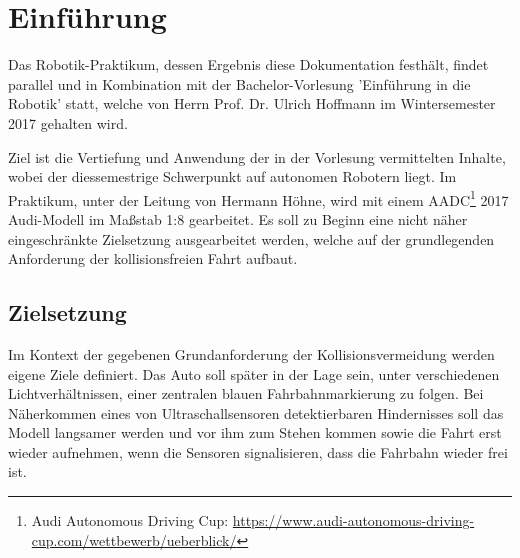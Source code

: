 \documentclass[12pt, a4paper]{scrartcl}
\begin{document}
\section{Einführung}

Das Robotik-Praktikum, dessen Ergebnis diese Dokumentation festhält, findet parallel und in Kombination mit der Bachelor-Vorlesung 'Einführung in die Robotik' statt, welche von Herrn Prof. Dr. Ulrich Hoffmann im Wintersemester 2017 gehalten wird.

Ziel ist die Vertiefung und Anwendung der in der Vorlesung vermittelten Inhalte, wobei der diessemestrige Schwerpunkt  auf autonomen Robotern liegt. Im Praktikum, unter der Leitung von Hermann Höhne, wird mit einem AADC\footnote{Audi Autonomous Driving Cup: \url{https://www.audi-autonomous-driving-cup.com/wettbewerb/ueberblick/}} 2017 Audi-Modell im Maßstab 1:8 gearbeitet. Es soll zu Beginn eine nicht näher eingeschränkte Zielsetzung ausgearbeitet werden, welche auf der grundlegenden Anforderung der kollisionsfreien Fahrt aufbaut.

\subsection{Zielsetzung} \label{zielsetzung}

Im Kontext der gegebenen Grundanforderung der Kollisionsvermeidung werden eigene Ziele definiert. Das Auto soll später in der Lage sein, unter verschiedenen Lichtverhältnissen, einer zentralen blauen Fahrbahnmarkierung zu folgen. Bei Näherkommen eines von Ultraschallsensoren detektierbaren Hindernisses soll das Modell langsamer werden und vor ihm zum Stehen kommen sowie die Fahrt erst wieder aufnehmen, wenn die Sensoren signalisieren, dass die Fahrbahn wieder frei ist.
\end{document}
